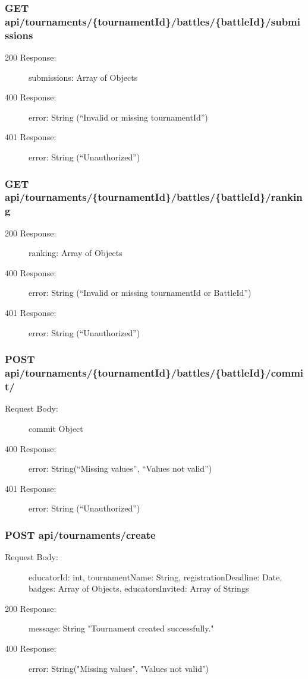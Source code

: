 \documentclass{Configuration_Files/Template}
\begin{document}
\subsubsection{GET api/tournaments/\{tournamentId\}/battles/\{battleId\}/submissions}
\begin{description}
    \item[200 Response:] submissions: Array of Objects
    \item[400 Response:] error: String (“Invalid or missing tournamentId”)
    \item[401 Response:] error: String (“Unauthorized”)
\end{description}

\subsubsection{GET api/tournaments/\{tournamentId\}/battles/\{battleId\}/ranking}
\begin{description}
    \item[200 Response:] ranking: Array of Objects
    \item[400 Response:] error: String (“Invalid or missing tournamentId or BattleId”)
    \item[401 Response:] error: String (“Unauthorized”)
\end{description}

\subsubsection{POST api/tournaments/\{tournamentId\}/battles/\{battleId\}/commit/}
\begin{description}
    \item[Request Body:] commit Object
    \item[400 Response:] error: String(“Missing values”, “Values not valid”)
    \item[401 Response:] error: String (“Unauthorized”)
\end{description}

\subsubsection{POST api/tournaments/create}
\begin{description}
    \item[Request Body:] educatorId: int, tournamentName: String, registrationDeadline: Date, badges: Array of Objects, educatorsInvited: Array of Strings
    \item[200 Response:] message: String "Tournament created successfully."
    \item[400 Response:] error: String("Missing values", "Values not valid")
\end{description}
\end{document}
